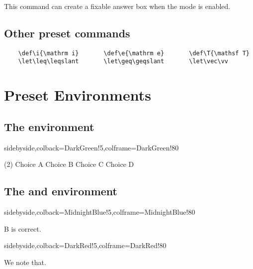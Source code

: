 \documentclass[mtpro2]{litesolution}
\begin{document}
This command can create a fixable answer box when the mode  is enabled.

\subsection{Other preset commands}

\begin{verbatim}
    \def\i{\mathrm i}       \def\e{\mathrm e}       \def\T{\mathsf T}
    \let\leq\leqslant       \let\geq\geqslant       \let\vec\vv
\end{verbatim}

\section{Preset  Environments}

\subsection{The  environment}

\begin{tcblisting}{sidebyside,colback=DarkGreen!5,colframe=DarkGreen!80}
\begin{problem}[Keywords]\leavevmode
\begin{tasks}(2)
  \task Choice A  \task[\true] Choice B
  \task Choice C  \task Choice D
\end{tasks}
\end{problem}
\end{tcblisting}

\subsection{The  and  environment}

\begin{minipage}{.48\textwidth}
\begin{tcblisting}{sidebyside,colback=MidnightBlue!5,colframe=MidnightBlue!80}
\begin{solution}
  B is correct.
\end{solution}
\end{tcblisting}
\end{minipage}
\hfill
\begin{minipage}{.48\textwidth}
\begin{tcblisting}{sidebyside,colback=DarkRed!5,colframe=DarkRed!80}
\begin{note}
  We note that.
\end{note}
\end{tcblisting}    
\end{minipage}
\end{document}
